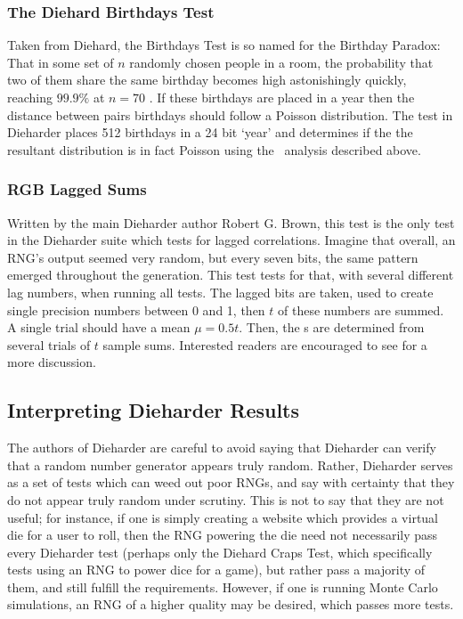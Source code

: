 \subsubsection{The Diehard Birthdays Test}
Taken from Diehard, the Birthdays Test is so named for the Birthday Paradox: That in some set of $n$ randomly chosen people in a room, the probability that two of them share the same birthday becomes high astonishingly quickly, reaching $99.9\%$ at $n=70$ \cite{abramson1970more}. If these birthdays are placed in a year then the distance between pairs birthdays should follow a Poisson distribution. The test in Dieharder places 512 birthdays in a 24 bit `year' and determines if the the resultant distribution is in fact Poisson using the \pvalue~analysis described above.

\subsubsection{RGB Lagged Sums}
Written by the main Dieharder author Robert G. Brown, this test is the only test in the Dieharder suite which tests for lagged correlations. Imagine that overall, an RNG's output seemed very random, but every seven bits, the same pattern emerged throughout the generation. This test tests for that, with several different lag numbers, when running all tests. The lagged bits are taken, used to create single precision numbers between 0 and 1, then $t$ of these numbers are summed. A single trial should have a mean $\mu = 0.5 t$. Then, the \pvalue s are determined from several trials of $t$ sample sums. Interested readers are encouraged to see \cite{dieharder_manual} for a more discussion.

\subsection{Interpreting Dieharder Results}
The authors of Dieharder are careful to avoid saying that Dieharder can verify that a random number generator appears truly random. Rather, Dieharder serves as a set of tests which can weed out poor RNGs, and say with certainty that they do not appear truly random under scrutiny. This is not to say that they are not useful; for instance, if one is simply creating a website which provides a virtual die for a user to roll, then the RNG powering the die need not necessarily pass every Dieharder test (perhaps only the Diehard Craps Test, which specifically tests using an RNG to power dice for a game), but rather pass a majority of them, and still fulfill the requirements. However, if one is running Monte Carlo simulations, an RNG of a higher quality may be desired, which passes more tests.

